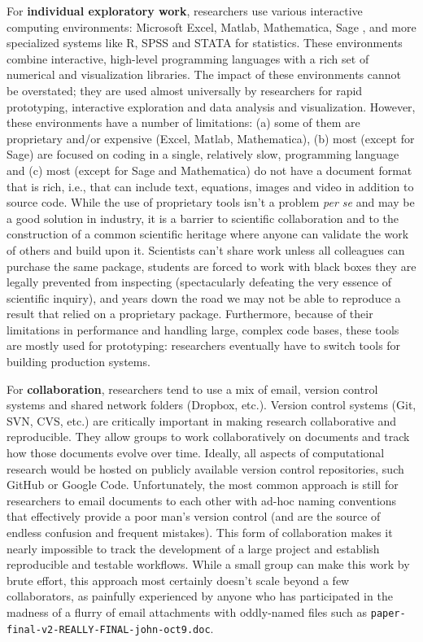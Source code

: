 \documentclass[ChapterTOCs,krantz2]{krantz} %
\begin{document}
For \textbf{individual exploratory work}, researchers use various interactive
computing environments: Microsoft Excel, Matlab, Mathematica, Sage \cite{sage},
and more specialized systems like R, SPSS and STATA for statistics. These
environments combine interactive, high-level programming languages with a rich
set of numerical and visualization libraries. The impact of these environments
cannot be overstated; they are used almost universally by researchers for rapid
prototyping, interactive exploration and data analysis and
visualization. However, these environments have a number of limitations: (a)
some of them are proprietary and/or expensive (Excel, Matlab, Mathematica), (b)
most (except for Sage) are focused on coding in a single, relatively slow,
programming language and (c) most (except for Sage and Mathematica) do not have
a document format that is rich, i.e., that can include text, equations, images
and video in addition to source code. While the use of proprietary tools isn't
a problem \emph{per se} and may be a good solution in industry, it is a barrier
to scientific collaboration and to the construction of a common scientific
heritage where anyone can validate the work of others and build upon it.
Scientists can't share work unless all colleagues can purchase the same
package, students are forced to work with black boxes they are legally
prevented from inspecting (spectacularly defeating the very essence of
scientific inquiry), and years down the road we may not be able to reproduce a
result that relied on a proprietary package. Furthermore, because of their
limitations in performance and handling large, complex code bases, these tools
are mostly used for prototyping: researchers eventually have to switch tools
for building production systems.

For \textbf{collaboration}, researchers tend to use a mix of email, version
control systems and shared network folders (Dropbox, etc.).  Version control
systems (Git, SVN, CVS, etc.) are critically important in making research
collaborative and reproducible. They allow groups to work collaboratively on
documents and track how those documents evolve over time. Ideally, all aspects
of computational research would be hosted on publicly available version control
repositories, such GitHub or Google Code. Unfortunately, the most common
approach is still for researchers to email documents to each other with ad-hoc
naming conventions that effectively provide a poor man's version control (and
are the source of endless confusion and frequent mistakes). This form of
collaboration makes it nearly impossible to track the development of a large
project and establish reproducible and testable workflows.  While a small group
can make this work by brute effort, this approach most certainly doesn't scale
beyond a few collaborators, as painfully experienced by anyone who has
participated in the madness of a flurry of email attachments with oddly-named
files such as {\tt paper-final-v2-REALLY-FINAL-john-oct9.doc}.
\end{document}
